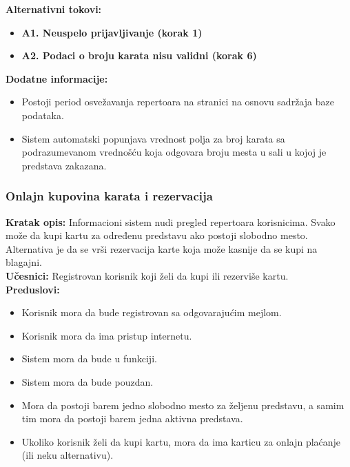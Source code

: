 \documentclass[a4paper]{article}
\begin{document}
\noindent\textbf{Alternativni tokovi:} 
\begin{itemize}
  \item \textbf{A1. Neuspelo prijavljivanje (korak 1)} 
  \item \textbf{A2. Podaci o broju karata nisu validni (korak 6)} 
\end{itemize}

\noindent\textbf{Dodatne informacije:} 
  \begin{itemize}
    \item Postoji period osvežavanja repertoara na stranici na osnovu
          sadržaja baze podataka. 
    \item Sistem automatski popunjava vrednost polja za broj karata sa podrazumevanom
          vrednošću koja odgovara broju mesta u sali u kojoj je predstava zakazana.
  \end{itemize}

\subsubsection{Onlajn kupovina karata i rezervacija}

\noindent\textbf{Kratak opis:} Informacioni sistem nudi pregled repertoara korisnicima. 
        Svako može da kupi kartu za određenu predstavu ako postoji slobodno mesto.
        Alternativa je da se vrši rezervacija karte koja može kasnije da se kupi na blagajni.\\

\noindent\textbf{Učesnici:} Registrovan korisnik koji želi da kupi ili rezerviše kartu.\\

\noindent\textbf{Preduslovi:} 
  \begin{itemize}
    \item Korisnik mora da bude registrovan sa odgovarajućim mejlom. 
    \item Korisnik mora da ima pristup internetu.
    \item Sistem mora da bude u funkciji.
    \item Sistem mora da bude pouzdan. 
    \item Mora da postoji barem jedno slobodno mesto za željenu predstavu, a samim tim mora da 
          postoji barem jedna aktivna predstava. 
    \item Ukoliko korisnik želi da kupi kartu, mora da ima karticu za onlajn plaćanje (ili 
          neku alternativu).
  \end{itemize}
  
\end{document}
